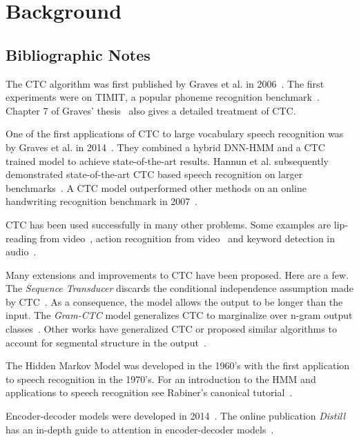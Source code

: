\chapter{Background}




\section{Bibliographic Notes}

The CTC algorithm was first published by Graves et al. in
2006~\cite{graves2006}. The first experiments were on TIMIT, a popular phoneme
recognition benchmark~\cite{lopes2011}. Chapter 7 of Graves'
thesis~\cite{graves2012} also gives a detailed treatment of CTC.

One of the first applications of CTC to large vocabulary speech recognition was
by Graves et al. in 2014~\cite{graves2014}. They combined a hybrid DNN-HMM and
a CTC trained model to achieve state-of-the-art results. Hannun et al.
subsequently demonstrated state-of-the-art CTC based speech recognition on
larger benchmarks~\cite{hannun2014deepspeech}. A CTC model outperformed other
methods on an online handwriting recognition benchmark in
2007~\cite{liwicki2007}.

CTC has been used successfully in many other problems. Some examples are
lip-reading from video~\cite{assael2016}, action recognition from
video~\cite{huang2016} and keyword detection in audio~\cite{fernandez2007,
lengerich2016}.

Many extensions and improvements to CTC have been proposed. Here are a few.
The {\it Sequence Transducer} discards the conditional independence assumption
made by CTC~\cite{graves2012transducer}. As a consequence, the model allows the
output to be longer than the input. The {\it Gram-CTC} model generalizes CTC to
marginalize over n-gram output classes~\cite{liu2017}. Other works have
generalized CTC or proposed similar algorithms to account for segmental
structure in the output~\cite{wang2017, kong2016}.

The Hidden Markov Model was developed in the 1960's with the first application
to speech recognition in the 1970's. For an introduction to the HMM and
applications to speech recognition see Rabiner's canonical
tutorial~\cite{rabiner1989}.

Encoder-decoder models were developed in 2014~\cite{cho2014, sutskever2014}.
The online publication {\it Distill} has an in-depth guide to attention in
encoder-decoder models~\cite{olah2016}.
